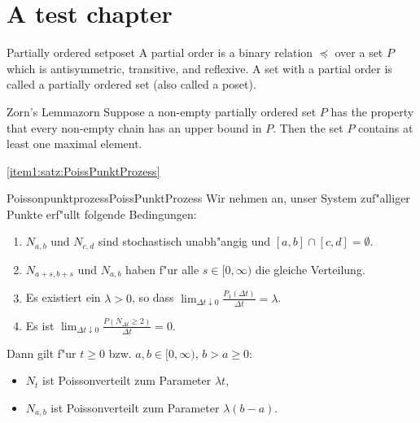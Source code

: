 \documentclass{scrbook}
\newcounter{defi}
\begin{document}
\chapter{A test chapter}

\begin{defi}{Partially ordered set}{poset}
A partial order is a binary relation $\preccurlyeq$ over a set $P$ which is antisymmetric, transitive, and reflexive. A set with a partial order is called a partially ordered set (also called a poset). 
\end{defi}

\begin{lemm}{Zorn's Lemma}{zorn}
Suppose a non-empty partially ordered set $P$ has the property that every non-empty chain has an upper bound in $P$. Then the set $P$ contains at least one maximal element.
\end{lemm}
\ref{item1:satz:PoissPunktProzess}
\lipsum[1-2]

\begin{lemm}{Poissonpunktprozess}{PoissPunktProzess}
Wir nehmen an, unser System zuf"alliger Punkte erf"ullt folgende Bedingungen:
\begin{enumerate}
\item $N_{a,b}$ und $N_{c,d}$ sind stochastisch unabh"angig und $[a,b] \cap [c,d] = \emptyset$. \label{item1:satz:PoissPunktProzess}
\item $N_{a+s,b+s}$ und $N_{a,b}$ haben f"ur alle $s \in [0,\infty)$ die gleiche Verteilung. \label{item2:satz:PoissPunktProzess}
\item Es existiert ein $\lambda > 0$, so dass $\lim_{\Delta t \downarrow 0} \frac{P_1(\Delta t)}{\Delta t} = \lambda$. \label{item3:satz:PoissPunktProzess}
\item Es ist $\lim_{\Delta t \downarrow 0} \frac{P(N_{\Delta t} \geq 2)}{\Delta t} = 0$. \label{item4:satz:PoissPunktProzess}
\end{enumerate}
Dann gilt f"ur $t \geq 0$ bzw. $a,b \in [0,\infty)$, $b > a \geq 0$:
\begin{itemize}
\item $N_t$ ist Poissonverteilt zum Parameter $\lambda t$,
\item $N_{a,b}$ ist Poissonverteilt zum Parameter $\lambda(b-a)$.
\end{itemize}
\end{lemm}
\end{document}
